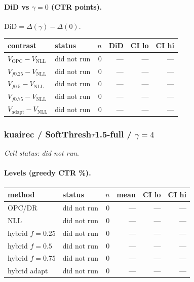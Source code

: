 \documentclass[10pt,a4paper]{article}
\begin{document}
\paragraph{DiD vs $\gamma=0$ (CTR points).} $\mathrm{DiD}=\Delta(\gamma)-\Delta(0)$.
{\centering\small\begin{tabular}{llrrrr}
\toprule contrast & status & $n$ & DiD & CI lo & CI hi \\
\midrule
$V_{\mathrm{OPC}}-V_{\mathrm{NLL}}$ & did not run & 0 & --- & --- & --- \\
$V_{f0.25}-V_{\mathrm{NLL}}$ & did not run & 0 & --- & --- & --- \\
$V_{f0.5}-V_{\mathrm{NLL}}$ & did not run & 0 & --- & --- & --- \\
$V_{f0.75}-V_{\mathrm{NLL}}$ & did not run & 0 & --- & --- & --- \\
$V_{\mathrm{adapt}}-V_{\mathrm{NLL}}$ & did not run & 0 & --- & --- & --- \\
\bottomrule\end{tabular}\par}
\bigskip
\subsubsection{kuairec / SoftThresh$\tau$1.5-full / $\gamma=4$}
\emph{Cell status: did not run}.
\paragraph{Levels (greedy CTR \%).}
{\centering\small\begin{tabular}{llrrrr}
\toprule method & status & $n$ & mean & CI lo & CI hi \\
\midrule
OPC/DR & did not run & 0 & --- & --- & --- \\
NLL & did not run & 0 & --- & --- & --- \\
hybrid $f{=}0.25$ & did not run & 0 & --- & --- & --- \\
hybrid $f{=}0.5$ & did not run & 0 & --- & --- & --- \\
hybrid $f{=}0.75$ & did not run & 0 & --- & --- & --- \\
hybrid adapt & did not run & 0 & --- & --- & --- \\
\bottomrule\end{tabular}\par}
\end{document}
